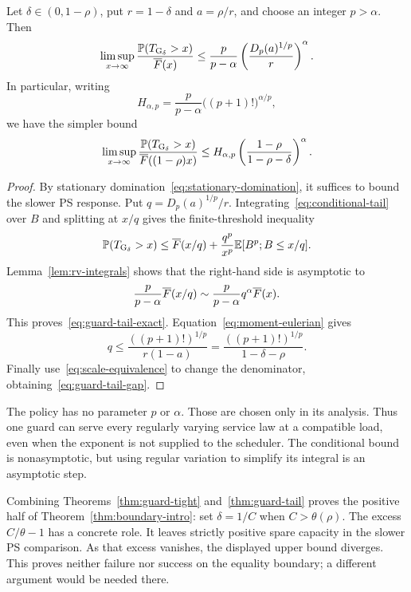 \begin{theorem}\label{thm:guard-tail}
Let $\delta\in(0,1-\rho)$, put $r=1-\delta$ and $a=\rho/r$, and choose an integer $p>\alpha$. Then
\begin{equation}\label{eq:guard-tail-exact}
 \limsup_{x\to\infty}\frac{\mathbb P(T_{\operatorname{G}_\delta}>x)}{\overline F(x)}
 \leq\frac p{p-\alpha}
       \left(\frac{D_p(a)^{1/p}}r\right)^\alpha.
\end{equation}
In particular, writing
\begin{equation}\label{eq:H-constant}
 H_{\alpha,p}=\frac p{p-\alpha}\bigl((p+1)!\bigr)^{\alpha/p},
\end{equation}
we have the simpler bound
\begin{equation}\label{eq:guard-tail-gap}
 \limsup_{x\to\infty}
 \frac{\mathbb P(T_{\operatorname{G}_\delta}>x)}{\overline F((1-\rho)x)}
 \leq H_{\alpha,p}
       \left(\frac{1-\rho}{1-\rho-\delta}\right)^\alpha.
\end{equation}
\end{theorem}
\begin{proof}
By stationary domination~\eqref{eq:stationary-domination}, it suffices to bound the slower PS response. Put $q=D_p(a)^{1/p}/r$. Integrating~\eqref{eq:conditional-tail} over $B$ and splitting at $x/q$ gives the finite-threshold inequality
\begin{equation}\label{eq:finite-threshold-bound}
 \mathbb P(T_{\operatorname{G}_\delta}>x)
 \leq\overline F(x/q)+\frac{q^p}{x^p}\mathbb E[B^p;B\leq x/q].
\end{equation}
Lemma~\ref{lem:rv-integrals} shows that the right-hand side is asymptotic to
\[
 \frac p{p-\alpha}\overline F(x/q)
 \sim\frac p{p-\alpha}q^\alpha\overline F(x).
\]
This proves~\eqref{eq:guard-tail-exact}. Equation~\eqref{eq:moment-eulerian} gives
\[
 q\leq\frac{((p+1)!)^{1/p}}{r(1-a)}
       =\frac{((p+1)!)^{1/p}}{1-\delta-\rho}.
\]
Finally use~\eqref{eq:scale-equivalence} to change the denominator, obtaining~\eqref{eq:guard-tail-gap}.
\end{proof}

The policy has no parameter $p$ or $\alpha$. Those are chosen only in its analysis. Thus one guard can serve every regularly varying service law at a compatible load, even when the exponent is not supplied to the scheduler. The conditional bound is nonasymptotic, but using regular variation to simplify its integral is an asymptotic step.

Combining Theorems~\ref{thm:guard-tight} and~\ref{thm:guard-tail} proves the positive half of Theorem~\ref{thm:boundary-intro}: set $\delta=1/C$ when $C>\theta(\rho)$. The excess $C/\theta-1$ has a concrete role. It leaves strictly positive spare capacity in the slower PS comparison. As that excess vanishes, the displayed upper bound diverges. This proves neither failure nor success on the equality boundary; a different argument would be needed there.
